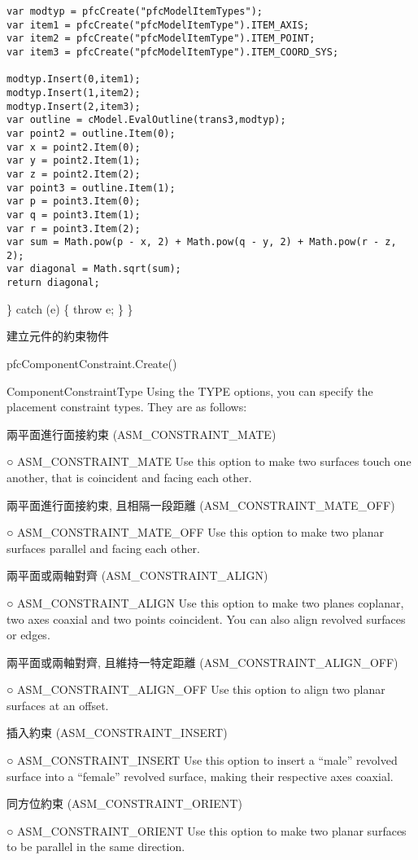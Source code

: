 \documentclass[]{article}
\begin{document}
\begin{verbatim}
var modtyp = pfcCreate("pfcModelItemTypes");
var item1 = pfcCreate("pfcModelItemType").ITEM_AXIS;
var item2 = pfcCreate("pfcModelItemType").ITEM_POINT;
var item3 = pfcCreate("pfcModelItemType").ITEM_COORD_SYS;

modtyp.Insert(0,item1);
modtyp.Insert(1,item2);
modtyp.Insert(2,item3);
var outline = cModel.EvalOutline(trans3,modtyp);
var point2 = outline.Item(0);
var x = point2.Item(0);
var y = point2.Item(1);
var z = point2.Item(2);
var point3 = outline.Item(1);
var p = point3.Item(0);
var q = point3.Item(1);
var r = point3.Item(2);
var sum = Math.pow(p - x, 2) + Math.pow(q - y, 2) + Math.pow(r - z, 2);
var diagonal = Math.sqrt(sum);
return diagonal;
\end{verbatim}

\} catch (e) \{ throw e; \} \}

建立元件的約束物件

pfcComponentConstraint.Create()

ComponentConstraintType Using the TYPE options, you can specify the
placement constraint types. They are as follows:

兩平面進行面接約束 (ASM\_CONSTRAINT\_MATE)

○ ASM\_CONSTRAINT\_MATE Use this option to make two surfaces touch one
another, that is coincident and facing each other.

兩平面進行面接約束, 且相隔一段距離 (ASM\_CONSTRAINT\_MATE\_OFF)

○ ASM\_CONSTRAINT\_MATE\_OFF Use this option to make two planar surfaces
parallel and facing each other.

兩平面或兩軸對齊 (ASM\_CONSTRAINT\_ALIGN)

○ ASM\_CONSTRAINT\_ALIGN Use this option to make two planes coplanar,
two axes coaxial and two points coincident. You can also align revolved
surfaces or edges.

兩平面或兩軸對齊, 且維持一特定距離 (ASM\_CONSTRAINT\_ALIGN\_OFF)

○ ASM\_CONSTRAINT\_ALIGN\_OFF Use this option to align two planar
surfaces at an offset.

插入約束 (ASM\_CONSTRAINT\_INSERT)

○ ASM\_CONSTRAINT\_INSERT Use this option to insert a ``male'' revolved
surface into a ``female'' revolved surface, making their respective axes
coaxial.

同方位約束 (ASM\_CONSTRAINT\_ORIENT)

○ ASM\_CONSTRAINT\_ORIENT Use this option to make two planar surfaces to
be parallel in the same direction.
\end{document}
